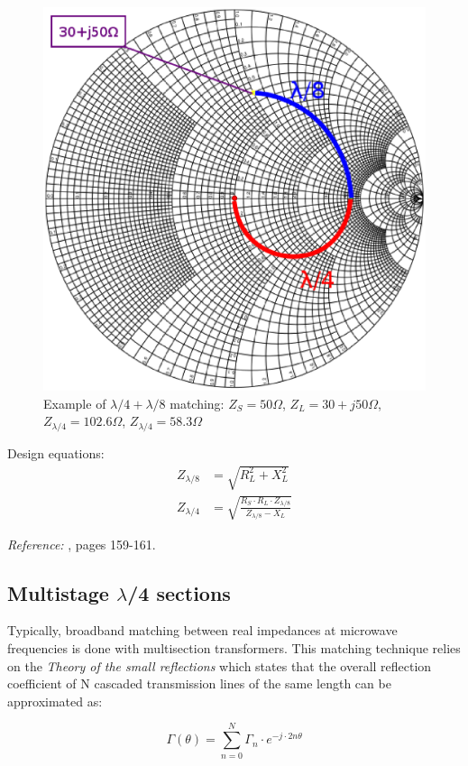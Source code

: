 \begin{figure}[H]
\centering
\includegraphics[width=120mm]{./images/Synthesis/Impedance_Matching/Smithl8l4}
\caption{Example of $\lambda/4 + \lambda/8$ matching: $Z_S = 50\Omega$, $Z_L = 30+j50\Omega$, $Z_{\lambda/4} = 102.6\Omega$, $Z_{\lambda/4} = 58.3\Omega$}
\label{fig:SmithL8L4}
\end{figure}


\noindent Design equations:
\begin{align}
Z_{\lambda/8} & = \sqrt{R_L^2 + X_L^2} \\
Z_{\lambda/4} & = \sqrt{\frac{R_S \cdot R_L \cdot Z_{\lambda/8}}{Z_{\lambda/8}-X_L}}
\end{align}


\noindent \textit{Reference:} \cite{BahlFundamentalsRFMW}, pages 159-161.


\subsection{Multistage $\lambda$/4 sections}
Typically, broadband matching between real impedances at microwave frequencies is done with multisection transformers. This matching technique relies on the \textit{Theory of the small reflections} which states that the overall reflection coefficient of N cascaded transmission lines of the same length can be approximated as:

\begin{equation}
\Gamma(\theta) = \sum \limits_{n=0}^{N} \Gamma_n \cdot e^{-j\cdot 2n \theta}
\label{eq:CascadeReflection}
\end{equation}

